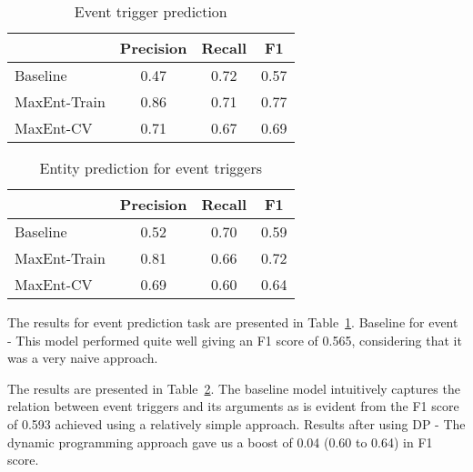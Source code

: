 
\begin{table}
\centering
\begin{tabular}{|l||c|c|c|} \hline
&\textbf{Precision} & \textbf{Recall} & \textbf{F1} \\ \hline
\hline
Baseline& 0.47 & 0.72&0.57\\
MaxEnt-Train& 0.86 & 0.71&  0.77 \\
MaxEnt-CV&0.71&0.67&0.69\\
\hline
\end{tabular}
\caption{Event trigger prediction}
\label{table:eventprediction}
\end{table}

\begin{table}
\centering
\begin{tabular}{|l||c|c|c|} \hline
&\textbf{Precision} & \textbf{Recall} & \textbf{F1} \\ \hline
\hline
Baseline&0.52&0.70&0.59\\
MaxEnt-Train&0.81&0.66&0.72\\
MaxEnt-CV&0.69&0.60&0.64\\
\hline
\end{tabular}
\caption{Entity prediction for event triggers}
\label{table:entityprediction}
\end{table}

The results for event prediction task are presented in Table~\ref{table:eventprediction}. Baseline for event - This model performed quite well giving an F1 score of 0.565, considering that it was a very naive approach. 

The results are presented in Table~\ref{table:entityprediction}. The baseline model intuitively captures the relation between event triggers and its arguments as is evident from the F1 score of 0.593 achieved using a relatively simple approach. Results after using DP - The dynamic programming approach gave us a boost of 0.04 (0.60 to 0.64) in F1 score. 